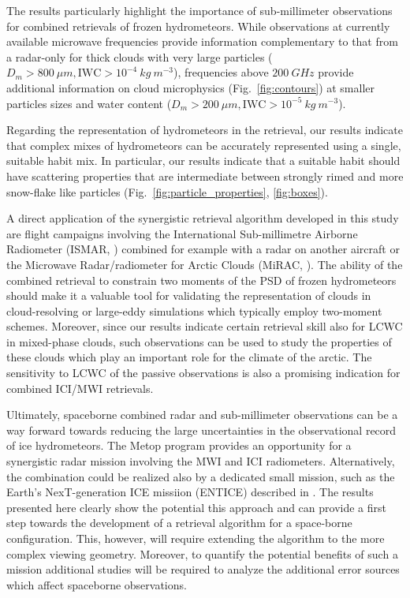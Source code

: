 \documentclass[journal abbreviation, manuscript]{copernicus}
\begin{document}
The results particularly highlight the importance of sub-millimeter observations
for combined retrievals of frozen hydrometeors. While observations at currently
available microwave frequencies provide information complementary to that from a
radar-only for thick clouds with very large particles ($D_m > 800\ \unit{\mu m},
\text{IWC} > 10^{-4}\ \unit{kg\ m^{-3}}$), frequencies above $200\ \unit{GHz}$
provide additional information on cloud microphysics (Fig.~\ref{fig:contours})
at smaller particles sizes and water content ($D_m > 200\ \unit{\mu m},
\text{IWC} > 10^{-5}\ \unit{kg\ m^{-3}}$).

Regarding the representation of hydrometeors in the retrieval, our results
indicate that complex mixes of hydrometeors can be accurately represented using
a single, suitable habit mix. In particular, our results indicate that a
suitable habit should have scattering properties that are intermediate between
strongly rimed and more snow-flake like particles
(Fig.~\ref{fig:particle_properties}, \ref{fig:boxes}).

A direct application of the synergistic retrieval algorithm developed in this
study are flight campaigns involving the International Sub-millimetre Airborne
Radiometer (ISMAR, \citet{fox17}) combined for example with a radar on another
aircraft or the Microwave Radar/radiometer for Arctic Clouds (MiRAC,
\citet{mech19}). The ability of the combined retrieval to constrain two moments
of the PSD of frozen hydrometeors should make it a valuable tool for validating
the representation of clouds in cloud-resolving or large-eddy simulations which
typically employ two-moment schemes. Moreover, since our results indicate
certain retrieval skill also for LCWC in mixed-phase clouds, such observations
can be used to study the properties of these clouds which play an important role
for the climate of the arctic. The sensitivity to LCWC of the passive
observations is also a promising indication for combined ICI/MWI retrievals.

Ultimately, spaceborne combined radar and sub-millimeter observations can be a
way forward towards reducing the large uncertainties in the observational record
of ice hydrometeors. The Metop program provides an opportunity for a synergistic
radar mission involving the MWI and ICI radiometers. Alternatively, the
combination could be realized also by a dedicated small mission, such as the
Earth's NexT-generation ICE missiion (ENTICE) described in \citet{jiang19}. The
results presented here clearly show the potential this approach and can provide
a first step towards the development of a retrieval algorithm for a space-borne
configuration. This, however, will require extending the algorithm to the more
complex viewing geometry. Moreover, to quantify the potential benefits of such a
mission additional studies will be required to analyze the additional error
sources which affect spaceborne observations.
\end{document}

